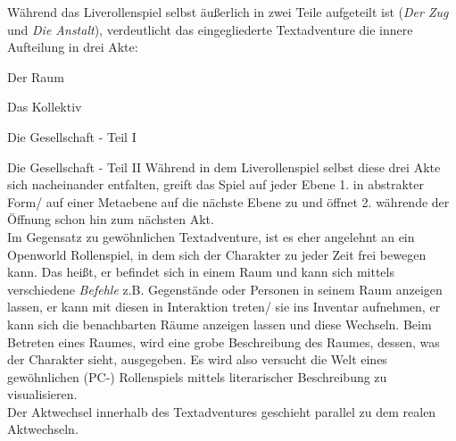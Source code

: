 \documentclass[12pt, a4paper, openany]{report}
\let\tempone\itemize
\let\temptwo\enditemize
\renewenvironment{itemize}{\tempone\addtolength{\itemsep}{-0.5\baselineskip}}{\temptwo}
\begin{document}
Während das Liverollenspiel selbst äußerlich in zwei Teile aufgeteilt ist (\textit{Der Zug} und \textit{Die Anstalt}), verdeutlicht das eingegliederte Textadventure die innere Aufteilung in drei Akte: 
\begin{itemize}
\item[I] Der Raum
\item[II] Das Kollektiv 
\item[III] Die Gesellschaft - Teil I
\item[IV] Die Gesellschaft - Teil II
\end{itemize}
Während in dem Liverollenspiel selbst diese drei Akte sich nacheinander entfalten, greift das Spiel auf jeder Ebene 1. in abstrakter Form/ auf einer Metaebene auf die nächste Ebene zu und öffnet 2. währende der Öffnung schon hin zum nächsten Akt. \\
Im Gegensatz zu \glqq gewöhnlichen\grqq{} Textadventure, ist es eher angelehnt an ein Openworld Rollenspiel, in dem sich der Charakter zu jeder Zeit frei bewegen kann.
Das heißt, er befindet sich in einem Raum und kann sich mittels verschiedene \textit{Befehle} z.B. Gegenstände oder Personen in seinem Raum anzeigen lassen, er kann mit diesen in Interaktion treten/ sie ins Inventar aufnehmen, er kann sich die benachbarten Räume anzeigen lassen und diese Wechseln. 
Beim Betreten eines Raumes, wird eine grobe Beschreibung des Raumes, dessen, was der Charakter sieht, ausgegeben. 
Es wird also versucht die Welt eines gewöhnlichen (PC-) Rollenspiels mittels literarischer Beschreibung zu visualisieren. \\
Der Aktwechsel innerhalb des Textadventures geschieht parallel zu dem realen Aktwechseln. 
\end{document}
